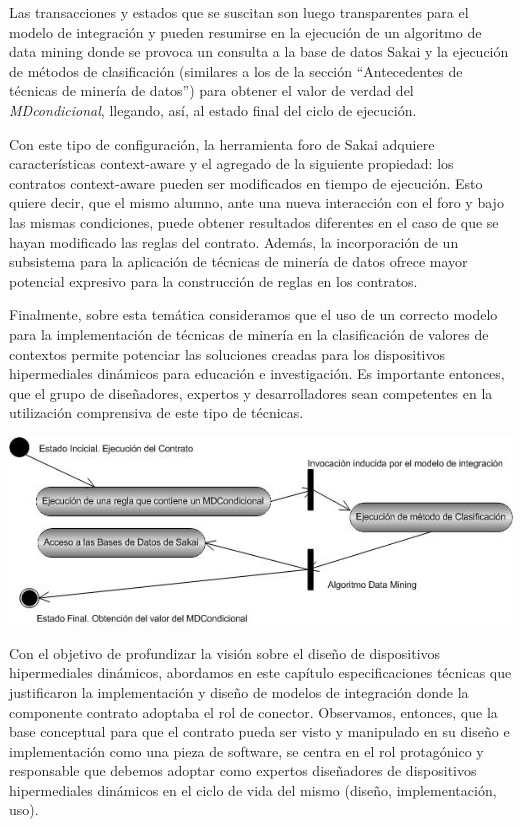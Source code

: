 Las transacciones y estados que se suscitan son luego transparentes para el
modelo de integración y pueden resumirse en la ejecución de un algoritmo de
data mining donde se provoca un consulta a la base de datos Sakai y la ejecución
de métodos de clasificación (similares a los de la sección “Antecedentes
de técnicas de minería de datos”) para obtener el valor de verdad del
\textit{MDcondicional}, llegando, así, al estado final del ciclo de ejecución.


Con este tipo de configuración, la herramienta foro de Sakai adquiere
características context-aware y el agregado de la siguiente propiedad: los contratos
context-aware pueden ser modificados en tiempo de ejecución. Esto
quiere decir, que el mismo alumno, ante una nueva interacción con el foro y
bajo las mismas condiciones, puede obtener resultados diferentes en el caso de
que se hayan modificado las reglas del contrato. Además, la incorporación de
un subsistema para la aplicación de técnicas de minería de datos ofrece mayor
potencial expresivo para la construcción de reglas en los contratos.


Finalmente, sobre esta temática consideramos que el uso de un correcto
modelo para la implementación de técnicas de minería en la clasificación de
valores de contextos permite potenciar las soluciones creadas para los dispositivos
hipermediales dinámicos para educación e investigación. Es importante
entonces, que el grupo de diseñadores, expertos y desarrolladores sean competentes
en la utilización comprensiva de este tipo de técnicas.

\begin{center}
\includegraphics[width=6 in,totalheight=2 in]{Ch4/f4.jpg}
\end{center}



Con el objetivo de profundizar la visión sobre el diseño de dispositivos hipermediales
dinámicos, abordamos en este capítulo especificaciones técnicas que
justificaron la implementación y diseño de modelos de integración donde la
componente contrato adoptaba el rol de conector.
Observamos, entonces, que la base conceptual para que el contrato pueda
ser visto y manipulado en su diseño e implementación como una pieza de software,
se centra en el rol protagónico y responsable que debemos adoptar como
expertos diseñadores de dispositivos hipermediales dinámicos en el ciclo de
vida del mismo (diseño, implementación, uso).

